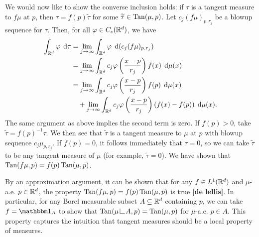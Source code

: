 We would now like to show the converse inclusion holds: if $\tau$ is a tangent measure to $f\mu$ at $p$, then $\tau = f(p) \widetilde{\tau}$ for some $\widetilde{\tau} \in \operatorname{Tan}(\mu,p)$. Let $c_j (f\mu)_{p,r_j}$ be a blowup sequence for $\tau$. Then, for all $\varphi \in C_c(\mathbb{R}^d)$, we have 
\begin{equation} \begin{aligned}
    \int_{\mathbb{R}^d} \varphi \; \operatorname{d}\!{\tau} &= \lim_{j \to \infty} \int_{\mathbb{R}^d} \varphi \; \operatorname{d}\!{(}c_j (f \mu)_{p,r_j}) \\
                                 &= \lim_{j \to \infty} \int_{\mathbb{R}^d} c_j \varphi\left( { \frac{x-p}{r_j} } \right) f(x) \; \operatorname{d}\!{\mu}(x) \\
                                 &= \lim_{j \to \infty} \int_{\mathbb{R}^d} c_j \varphi\left( { \frac{x-p}{r_j} } \right) f(p) \; \operatorname{d}\!{\mu}(x) \\
                                 &\quad + \lim_{j \to \infty} \int_{\mathbb{R}^d} c_j \varphi\left( { \frac{x-p}{r_j} } \right) (f(x) - f(p)) \; \operatorname{d}\!{\mu}(x).
\end{aligned} \end{equation}
The same argument as above implies the second term is zero. If $f(p) > 0$, take $\widetilde{\tau} = f(p)^{-1} \tau$. We then see that $\widetilde{\tau}$ is a tangent measure to $\mu$ at $p$ with blowup sequence $c_j \mu_{p,r_j}$. If $f(p) = 0$, it follows immediately that $\tau = 0$, so we can take $\widetilde{\tau}$ to be any tangent measure of $\mu$ (for example, $\widetilde{\tau} = 0$). We have shown that $\operatorname{Tan}(f\mu,p) = f(p)\operatorname{Tan}(\mu,p)$.

By an approximation argument, it can be shown that for any $f \in L^1(\mathbb{R}^d)$ and $\mu$-a.e. $p \in \mathbb{R}^d$, the property $\operatorname{Tan}(f\mu,p) = f(p) \operatorname{Tan}(\mu,p)$ is true {\bf [de lellis]}. In particular, for any Borel measurable subset $A \subseteq \mathbb{R}^d$ containing $p$, we can take $f = \bbone_A$ to show that $\Tan(\mu \restrict A,p) = \Tan(\mu,p)$ for $\mu$-a.e. $p \in A$. This property captures the intuition that tangent measures should be a local property of measures.

